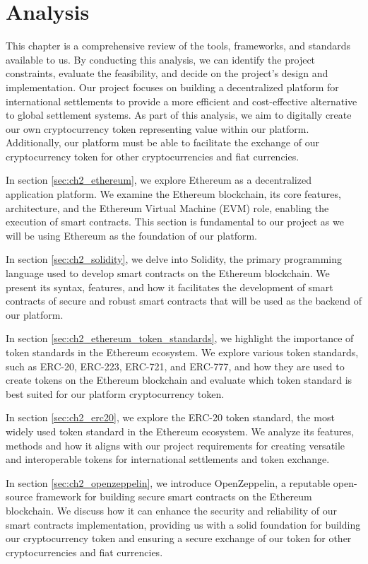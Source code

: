 \chapter{Analysis}
\label{ch:analysis}

This chapter is a comprehensive review of the tools, frameworks, and standards available to us. By conducting this analysis, we can identify the project constraints, evaluate the feasibility,
and decide on the project's design and implementation. Our project focuses on building a decentralized platform for international
settlements to provide a more efficient and cost-effective alternative to global settlement systems. As part of this analysis,
we aim to digitally create our own cryptocurrency token representing value within our platform. Additionally, our platform must be
able to facilitate the exchange of our cryptocurrency token for other cryptocurrencies and fiat currencies.


In section \ref{sec:ch2_ethereum}, we explore Ethereum as a decentralized application platform. We examine the Ethereum blockchain, its core features,
architecture, and the Ethereum Virtual Machine (EVM) role, enabling the execution of smart contracts. This section is fundamental to our project
as we will be using Ethereum as the foundation of our platform.


In section \ref{sec:ch2_solidity}, we delve into Solidity, the primary programming language used to develop smart contracts on the Ethereum blockchain.
We present its syntax, features, and how it facilitates the development of smart contracts of secure and robust smart contracts that will be used as the backend
of our platform.


In section \ref{sec:ch2_ethereum_token_standards}, we highlight the importance of token standards in the Ethereum ecosystem. We explore various token standards,
such as ERC-20, ERC-223, ERC-721, and ERC-777, and how they are used to create tokens on the Ethereum blockchain and evaluate which token standard is best
suited for our platform cryptocurrency token.


In section \ref{sec:ch2_erc20}, we explore the ERC-20 token standard, the most widely used token standard in the Ethereum ecosystem. We analyze its features,
methods and how it aligns with our project requirements for creating versatile and interoperable tokens for international settlements and token exchange.


In section \ref{sec:ch2_openzeppelin}, we introduce OpenZeppelin, a reputable open-source framework for building secure smart contracts on the Ethereum blockchain.
We discuss how it can enhance the security and reliability of our smart contracts implementation, providing us with a solid foundation for building our
cryptocurrency token and ensuring a secure exchange of our token for other cryptocurrencies and fiat currencies.


